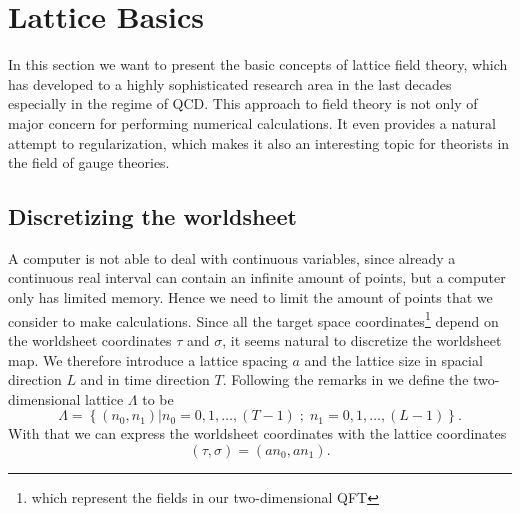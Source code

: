 \chapter{Lattice Basics}\label{ch: lattice_basics}
In this section we want to present the basic concepts of lattice field theory, which has developed to a highly sophisticated research area in the last decades especially in the regime of QCD. This approach to field theory is not only of major concern for performing numerical calculations. It even provides a natural attempt to regularization, which makes it also an interesting topic for theorists in the field of gauge theories.
\section{Discretizing the worldsheet}
\label{sec: disc_lat}
A computer is not able to deal with continuous variables, since already a continuous real interval can contain an infinite amount of points, but a computer only has limited memory. Hence we need to limit the amount of points that we consider to make calculations. Since all the target space coordinates\footnote{which represent the fields in our two-dimensional QFT} depend on the worldsheet coordinates $\tau$ and $\sigma$, it seems natural to discretize the worldsheet map. We therefore introduce a lattice spacing $a$ and the lattice size in spacial direction $L$ and in time direction $T$. Following the remarks in \cite{gattringer2009quantum} we define the two-dimensional lattice $\mathit{\Lambda}$ to be
\begin{equation}
\mathit{\Lambda} = \left\lbrace \left(n_{0},n_{1}\right) \vert n_{0}=0,1,\ldots,(T-1) \; ; \;  n_{1}=0,1,\ldots,(L-1) \right\rbrace.
\end{equation}
With that we can express the worldsheet coordinates with the lattice coordinates
\begin{equation}
\left( \tau,\sigma \right) = \left( an_{0},an_{1} \right).
\end{equation}
